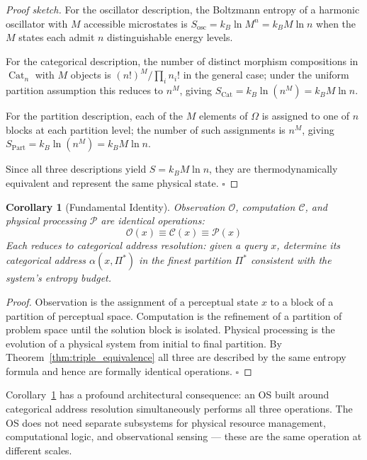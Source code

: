 \documentclass[12pt,twocolumn]{article}
\newtheorem{corollary}[theorem]{Corollary}
\DeclareMathOperator{\Cat}{Cat}
\DeclareMathOperator{\Part}{Part}
\begin{document}
\begin{proof}[Proof sketch]
For the oscillator description, the Boltzmann entropy of a harmonic oscillator with $M$ accessible microstates is $S_{\text{osc}} = k_B \ln M^n = k_B M \ln n$ when the $M$ states each admit $n$ distinguishable energy levels.

For the categorical description, the number of distinct morphism compositions in $\Cat_n$ with $M$ objects is $(n!)^M / \prod_i n_i!$ in the general case; under the uniform partition assumption this reduces to $n^M$, giving $S_{\Cat} = k_B \ln(n^M) = k_B M \ln n$.

For the partition description, each of the $M$ elements of $\Omega$ is assigned to one of $n$ blocks at each partition level; the number of such assignments is $n^M$, giving $S_{\Part} = k_B \ln(n^M) = k_B M \ln n$.

Since all three descriptions yield $S = k_B M \ln n$, they are thermodynamically equivalent and represent the same physical state. $\square$
\end{proof}

\begin{corollary}[Fundamental Identity]
\label{cor:fundamental_identity}
Observation $\mathcal{O}$, computation $\mathcal{C}$, and physical processing $\mathcal{P}$ are identical operations:
\begin{equation}
\mathcal{O}(x) \equiv \mathcal{C}(x) \equiv \mathcal{P}(x)
\end{equation}
Each reduces to categorical address resolution: given a query $x$, determine its categorical address $\alpha(x, \Pi^*)$ in the finest partition $\Pi^*$ consistent with the system's entropy budget.
\end{corollary}

\begin{proof}
Observation is the assignment of a perceptual state $x$ to a block of a partition of perceptual space. Computation is the refinement of a partition of problem space until the solution block is isolated. Physical processing is the evolution of a physical system from initial to final partition. By Theorem~\ref{thm:triple_equivalence} all three are described by the same entropy formula and hence are formally identical operations. $\square$
\end{proof}

Corollary~\ref{cor:fundamental_identity} has a profound architectural consequence: an OS built around categorical address resolution simultaneously performs all three operations. The OS does not need separate subsystems for physical resource management, computational logic, and observational sensing --- these are the same operation at different scales.
\end{document}
